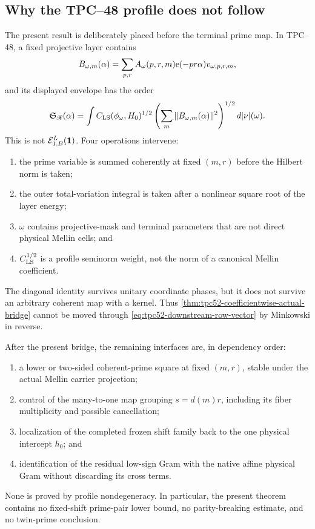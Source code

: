 \subsection{Why the TPC--48 profile does not follow}

The present result is deliberately placed before the terminal prime map.  In
TPC--48, a fixed projective layer contains
\begin{equation}
 B_{\omega,m}(\alpha)
 =\sum_{p,r}A_\omega(p,r,m)\mathrm e(-pr\alpha)
  v_{\omega,p,r,m},
 \label{eq:tpc52-downstream-row-vector}
\end{equation}
and its displayed envelope has the order
\begin{equation}
 \mathfrak S_{\mathscr R}(\alpha)
 =\int C_{\rm LS}(\phi_\omega,H_0)^{1/2}
 \left(\sum_m\|B_{\omega,m}(\alpha)\|^2\right)^{1/2}
 d|\nu|(\omega).
 \label{eq:tpc52-full-profile-reminder}
\end{equation}
This is not \(\mathcal E_{1,B}^L(\mathbf 1)\).  Four operations intervene:
\begin{enumerate}[label=\textup{(D\arabic*)},leftmargin=3.2em]
 \item the prime variable is summed coherently at fixed \((m,r)\) before
       the Hilbert norm is taken;
 \item the outer total-variation integral is taken after a nonlinear square
       root of the layer energy;
 \item \(\omega\) contains projective-mask and terminal parameters that are
       not direct physical Mellin cells; and
 \item \(C_{\rm LS}^{1/2}\) is a profile seminorm weight, not the norm of a
       canonical Mellin coefficient.
\end{enumerate}
The diagonal identity survives unitary coordinate phases, but it does not
survive an arbitrary coherent map with a kernel.  Thus
\cref{thm:tpc52-coefficientwise-actual-bridge} cannot be moved through
\eqref{eq:tpc52-downstream-row-vector} by Minkowski in reverse.

After the present bridge, the remaining interfaces are, in dependency order:
\begin{enumerate}[label=\textup{(O\arabic*)},leftmargin=3.2em]
 \item a lower or two-sided coherent-prime square at fixed \((m,r)\), stable
       under the actual Mellin carrier projection;
 \item control of the many-to-one map grouping \(s=d(m)r\), including its
       fiber multiplicity and possible cancellation;
 \item localization of the completed frozen shift family back to the one
       physical intercept \(h_0\); and
 \item identification of the residual low-sign Gram with the native affine
       physical Gram without discarding its cross terms.
\end{enumerate}
None is proved by profile nondegeneracy.  In particular, the present theorem
contains no fixed-shift prime-pair lower bound, no parity-breaking estimate,
and no twin-prime conclusion.
